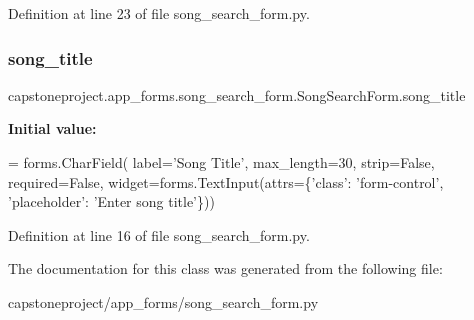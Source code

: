Definition at line 23 of file song\+\_\+search\+\_\+form.\+py.

\mbox{\label{classcapstoneproject_1_1app__forms_1_1song__search__form_1_1_song_search_form_ae269ab0e646eba5a1b4ad3e2e5a4d0ce}} 
\subsubsection{\texorpdfstring{song\+\_\+title}{song\_title}}
{\footnotesize\ttfamily capstoneproject.\+app\+\_\+forms.\+song\+\_\+search\+\_\+form.\+Song\+Search\+Form.\+song\+\_\+title\hspace{0.3cm}{\ttfamily [static]}}

{\bfseries Initial value\+:}
\begin{DoxyCode}
=  forms.CharField(
        label=\textcolor{stringliteral}{'Song Title'},
        max\_length=30,
        strip=\textcolor{keyword}{False},
        required=\textcolor{keyword}{False},
        widget=forms.TextInput(attrs=\{\textcolor{stringliteral}{'class'}: \textcolor{stringliteral}{'form-control'}, \textcolor{stringliteral}{'placeholder'}: \textcolor{stringliteral}{'Enter song title'}\}))
\end{DoxyCode}


Definition at line 16 of file song\+\_\+search\+\_\+form.\+py.



The documentation for this class was generated from the following file\+:\begin{DoxyCompactItemize}
\item 
capstoneproject/app\+\_\+forms/song\+\_\+search\+\_\+form.\+py\end{DoxyCompactItemize}
